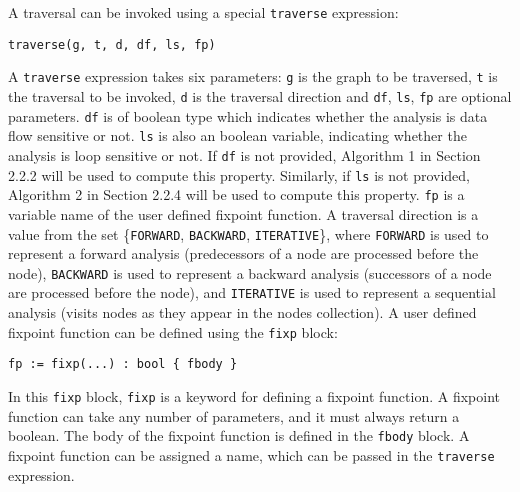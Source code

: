 A traversal can be invoked using a special \lstinline|traverse| expression:
\begin{lstlisting}
traverse(g, t, d, df, ls, fp)
\end{lstlisting}

A \lstinline|traverse| expression takes six parameters: \lstinline|g| is the
graph to be traversed, \lstinline|t| is the traversal to be invoked,
\lstinline|d| is the traversal direction and \lstinline|df|, \lstinline|ls|, \lstinline|fp| are optional
parameters. \lstinline|df| is of boolean type which indicates whether the analysis is data flow sensitive or not. \lstinline|ls| is also an boolean variable, indicating whether the analysis is loop sensitive or not. If \lstinline|df| is not provided, Algorithm 1 in Section 2.2.2 will be used to compute this property. Similarly, if \lstinline|ls| is not provided, Algorithm 2 in Section 2.2.4 will be used to compute this property. \lstinline|fp| is a variable name of the user defined fixpoint function. A
traversal direction is a value from the set \{\lstinline|FORWARD|,
\lstinline|BACKWARD|, \lstinline|ITERATIVE|\}, where \lstinline|FORWARD| is used
to represent a forward analysis (predecessors of a node are processed before the
node), \lstinline|BACKWARD| is used to represent a backward analysis (successors
of a node are processed before the node), and \lstinline|ITERATIVE| is used to
represent a sequential analysis (visits nodes as they appear in the nodes
collection).
A user defined fixpoint function can be defined using the \lstinline|fixp|
block:
\begin{lstlisting}
fp := fixp(...) : bool { fbody }
\end{lstlisting}

In this \lstinline|fixp| block, \lstinline|fixp| is a keyword for defining a
fixpoint function. A fixpoint function can take any number of parameters, and it
must always return a boolean. The body of the fixpoint function is defined in
the \lstinline|fbody| block. A fixpoint function can be assigned a name, which
can be passed in the \lstinline|traverse| expression.

